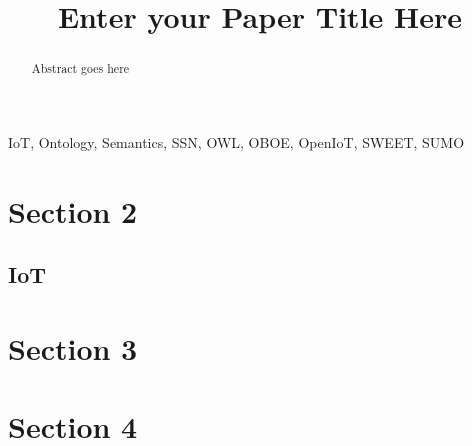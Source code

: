 \documentclass[conference]{IEEEtran}
\begin{document}

\title{Enter your Paper Title Here}



\author
{
}


\maketitle

\begin{abstract}
Abstract goes here

\end{abstract}


\begin {IEEEkeywords}
IoT, Ontology, Semantics,  SSN, OWL, OBOE, OpenIoT, SWEET, SUMO
\end{IEEEkeywords}



	






\section{Section 2}
\label{section2}
%



	\subsection{IoT}








\section{Section 3}
\label{section3}
%


\section{Section 4}
\label{section4}
%
\end{document}
